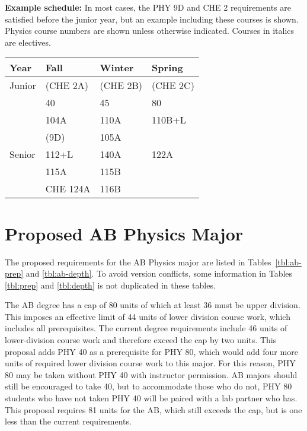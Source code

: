 \documentclass[12pt]{article}
\begin{document}
\noindent
{\bf Example schedule:} In most cases, the PHY 9D and CHE 2 requirements are
satisfied before the junior year, but an example including these courses is
shown.  Physics course numbers are shown unless otherwise indicated.
Courses in italics are electives.
\begin{center}
\begin{tabular}{|l|l|l|l|}
\hline
Year      & Fall    & Winter & Spring \\
\hline
Junior    & (CHE 2A)   & (CHE 2B)     & (CHE 2C) \\
          & 40         & 45           & 80 \\
          & 104A       & 110A         & 110B+L \\
          & (9D)       & 105A         & \\

\hline
Senior   & 112+L         & 140A       & 122A\\
         & 115A          & 115B       &  \\
         & CHE 124A      & 116B       &  \\
\hline
\end{tabular}
\end{center}

\section{Proposed AB Physics Major}
\label{sec:ab}



The proposed requirements for the AB Physics major are listed in
Tables~\ref{tbl:ab-prep} and \ref{tbl:ab-depth}.  To avoid version
conflicts, some information in Tables \ref{tbl:prep} and
\ref{tbl:depth} is not duplicated in these tables.

The AB degree has a cap of 80 units of which at least 36 must be upper
division.  This imposes an effective limit of 44 units of lower
division course work, which includes all prerequisites.  The current
degree requirements include 46 units of lower-division course work and
therefore exceed the cap by two units.  This proposal adds PHY 40 as a
prerequisite for PHY 80, which would add four more units of required
lower division course work to this major.  For this reason, PHY 80 may
be taken without PHY 40 with instructor permission.  AB majors should
still be encouraged to take 40, but to accommodate those who do not,
PHY 80 students who have not taken PHY 40 will be paired with a lab
partner who has.  This proposal requires 81 units for the AB, which
still exceeds the cap, but is one less than the current requirements.
\end{document}
